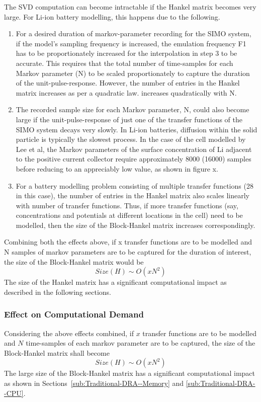 The SVD computation can become intractable if the Hankel matrix becomes
very large. For Li-ion battery modelling, this happens due to the
following.
\begin{enumerate}
\item For a desired duration of markov-parameter recording for the SIMO
system, if the model's sampling frequency is increased, the emulation
frequency F1 has to be proportionately increased for the interpolation
in step 3 to be accurate. This requires that the total number of time-samples
for each Markov parameter (N) to be scaled proportionately to capture
the duration of the unit-pulse-response. However, the number of entries
in the Hankel matrix increases as per a quadratic law.
increases quadratically with N.
\item The recorded sample size for each Markov parameter, N, could also
become large if the unit-pulse-response of just one of the transfer
functions of the SIMO system decays very slowly. In Li-ion batteries,
diffusion within the solid particle is typically the slowest process.
In the case of the cell modelled by Lee et al, the Markov parameters
of the surface concentration of Li adjacent to the positive current
collector require approximately 8000 (16000) samples before reducing
to an appreciably low value, as shown in figure x.
\item For a battery modelling problem consisting of multiple transfer functions
(28 in this case), the number of entries in the Hankel matrix also
scales linearly with number of transfer functions. Thus, if more transfer
functions (say, concentrations and potentials at different locations
in the cell) need to be modelled, then the size of the Block-Hankel
matrix increases correspondingly.
\end{enumerate}
Combining both the effects above, if x transfer functions are to be
modelled and N samples of markov parameters are to be captured for
the duration of interest, the size of the Block-Hankel matrix would
be
\[
Size(H)\sim O(xN^{2})
\]
 The size of the Hankel matrix has a significant computational impact
as described in the following sections.

\subsubsection{Effect on Computational Demand}
Considering the above effects combined, if $x$ transfer functions
are to be modelled and $N$ time-samples of each markov parameter
are to be captured, the size of the Block-Hankel matrix shall become
\begin{equation}
Size(H)\sim O(xN^{2})\label{eq:}
\end{equation}
 The large size of the Block-Hankel matrix has a significant computational
impact as shown in Sections~\ref{sub:Traditional-DRA--Memory} and
\ref{sub:Traditional-DRA--CPU}.

